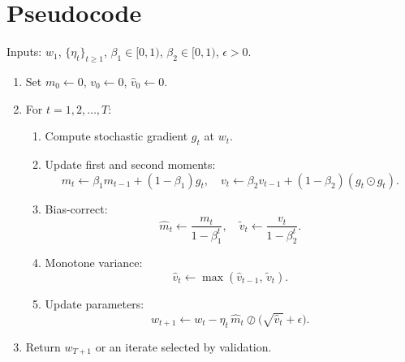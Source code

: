 \documentclass[11pt]{article}
\begin{document}
\section*{Pseudocode}
\noindent Inputs: $w_1$, $\{\eta_t\}_{t\ge1}$, $\beta_1\in[0,1)$, $\beta_2\in[0,1)$, $\epsilon>0$.
\begin{enumerate}
\item Set $m_0\gets 0$, $v_0\gets 0$, $\hat v_0\gets 0$.
\item For $t=1,2,\dots,T$:
  \begin{enumerate}
  \item Compute stochastic gradient $g_t$ at $w_t$.
  \item Update first and second moments:
    \[
    m_t \gets \beta_1 m_{t-1} + (1-\beta_1) g_t,\quad
    v_t \gets \beta_2 v_{t-1} + (1-\beta_2) (g_t \odot g_t).
    \]
  \item Bias-correct:
    \[
    \hat m_t \gets \frac{m_t}{1-\beta_1^t},\quad
    \tilde v_t \gets \frac{v_t}{1-\beta_2^t}.
    \]
  \item Monotone variance:
    \[
    \hat v_t \gets \max(\hat v_{t-1},\, \tilde v_t).
    \]
  \item Update parameters:
    \[
    w_{t+1} \gets w_t - \eta_t\, \hat m_t \oslash \big(\sqrt{\hat v_t} + \epsilon\big).
    \]
  \end{enumerate}
\item Return $w_{T+1}$ or an iterate selected by validation.
\end{enumerate}
\end{document}
